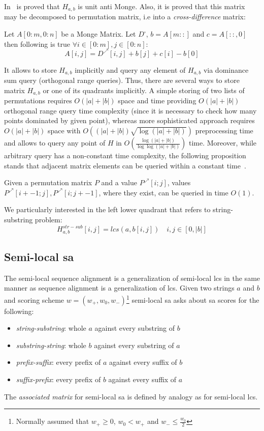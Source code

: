 In~\cite{tiskin} is proved that $H_{a,b}$ is unit anti Monge.
Also, it is proved that this matrix may be decomposed to permutation matrix, i.e into a \emph{cross-difference} matrix:
\begin{theorem}\cite{}\label{decomposition}
Let $A[0:m,0:n]$ be a Monge Matrix. Let $D^{\square}$, $b=A[m::]$ and $c=A[::,0]$ then following is true $\forall i \in [0:m],j\in [0:n]$:
$$ A[i,j] = D^{\nearrow}[i,j]+b[j]+c[i]-b[0] $$ 
\end{theorem}
It allows to store $H_{a,b}$ implicitly and query any element of $H_{a,b}$ via dominance sum query (orthogonal range queries).
Thus, there are several ways to store matrix $H_{a,b}$ or one of its quadrants implicitly.
A simple storing of two lists of permutations requires $O(|a|+|b|)$ space and time providing $O(|a|+|b|)$ orthogonal range query time complexity (since it is necessary to check how many points dominated by given point), whereas more sophisticated approach requires $O(|a|+|b|)$ space with $O( (|a|+|b|) \sqrt{\log{ (|a| +|b|)} } )$ preprocessing time and allows to query any point of $H$ in $O(\frac{\log (|a|+|b|)}{\log \log (|a|+|b|)})$ time.  
Moreover, while arbitrary query has a non-constant time complexity, the following proposition stands that adjacent matrix elements can be queried within a constant time~\cite{.}.
\begin{proposition}\label{incremental}
  Given a permutation matrix $P$ and a value $P^{\nearrow}[i; j]$,
  values $P^{\nearrow}[i +- 1; j], P^{\nearrow}[i; j +- 1]$, where they exist,
  can be queried in time $O(1)$.
\end{proposition}

We particularly interested in the left lower quadrant that refers to string-substring problem:
\begin{equation}
H_{a,b}^{str-sub}[i,j] = lcs(a,b[i,j]) \quad i,j \in [0,|b|] 
\end{equation}

\subsection{Semi-local sa}
The semi-local sequence alignment is a generalization of semi-local lcs in the same manner as sequence alignment is a generalization of lcs.
Given two strings $a$ and $b$ and scoring scheme $w=(w_{+},w_{0},w_{-})$\footnote{Normally assumed that $w_{+}\geq 0$, $w_{0} < w_{+}$ and $w_{-}\leq \frac{w_{0}}{2}$}  semi-local sa asks about sa scores for the following:
\begin{itemize}
\item \emph{string-substring}: whole $a$ against every substring of $b$
\item \emph{substring-string}: whole $b$ against every substring of $a$
\item \emph{prefix-suffix}: every prefix of $a$ against every suffix of $b$
\item \emph{suffix-prefix}: every prefix of $b$ against every suffix of $a$
\end{itemize} 
The \emph{associated matrix} for semi-local sa is defined by analogy as for semi-local lcs.

